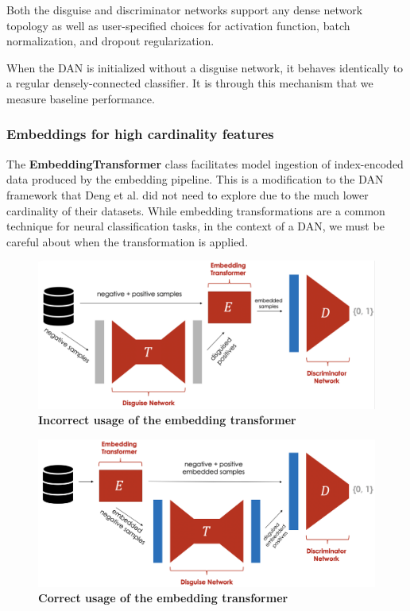 \documentclass{proc}
\begin{document}
Both the disguise and discriminator networks support any dense network topology as well as user-specified choices for activation function, batch normalization, and dropout regularization.

When the DAN is initialized without a disguise network, it behaves identically to a regular densely-connected classifier. It is through this mechanism that we measure baseline performance.

\subsubsection{Embeddings for high cardinality features}

The \textbf{EmbeddingTransformer} class facilitates model ingestion of index-encoded data produced by the embedding pipeline. This is a modification to the DAN framework that Deng et al. did not need to explore due to the much lower cardinality of their datasets. While embedding transformations are a common technique for neural classification tasks, in the context of a DAN, we must be careful about when the transformation is applied.

\begin{figure}[h!]
		\includegraphics*[scale=0.2]{../figures/embeddings-incorrect.png}
		\caption{\textbf{Incorrect usage of the embedding transformer}}
		\label{fig:embeddings-incorrect}
\end{figure}

\begin{figure}[h!]
		\includegraphics*[scale=0.2]{../figures/embeddings-correct.png}
		\caption{\textbf{Correct usage of the embedding transformer}}
		\label{fig:embeddings-correct}
\end{figure}
\end{document}
